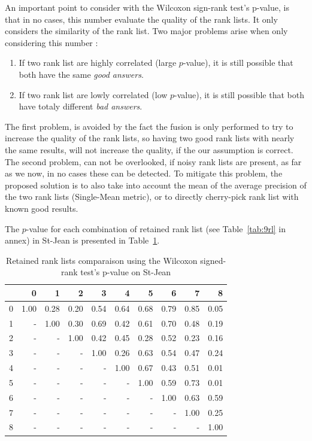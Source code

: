 An important point to consider with the Wilcoxon sign-rank test's p-value, is that in no cases, this number evaluate the quality of the rank lists.
It only considers the similarity of the rank list.
Two major problems arise when only considering this number :
\begin{enumerate}
  \item
  If two rank list are highly correlated (large $p$-value), it is still possible that both have the same \textit{good answers}.
  \item
  If two rank list are lowly correlated (low $p$-value), it is still possible that both have totaly different \textit{bad answers}.
\end{enumerate}
The first problem, is avoided by the fact the fusion is only performed to try to increase the quality of the rank lists, so having two good rank lists with nearly the same results, will not increase the quality, if the our assumption is correct.
The second problem, can not be overlooked, if noisy rank lists are present, as far as we now, in no cases these can be detected.
To mitigate this problem, the proposed solution is to also take into account the mean of the average precision of the two rank lists (Single-Mean metric), or to directly cherry-pick rank list with known good results.

The $p$-value for each combination of retained rank list (see Table~\ref{tab:9rl} in annex) in St-Jean is presented in Table~\ref{tab:rl_correlations}.

\begin{table}
  \centering
  \caption{Retained rank lists comparaison using the Wilcoxon signed-rank test's p-value on St-Jean}
  \label{tab:rl_correlations}
  \begin{tabular}{r|r r r r r r r r r}
    \toprule
      &    0 &    1 &    2 &    3 &    4 &    5 &    6 &    7 &    8 \\
    \midrule
    0 & 1.00 & 0.28 & 0.20 & 0.54 & 0.64 & 0.68 & 0.79 & 0.85 & 0.05 \\
    1 &    - & 1.00 & 0.30 & 0.69 & 0.42 & 0.61 & 0.70 & 0.48 & 0.19 \\
    2 &    - &    - & 1.00 & 0.42 & 0.45 & 0.28 & 0.52 & 0.23 & 0.16 \\
    3 &    - &    - &    - & 1.00 & 0.26 & 0.63 & 0.54 & 0.47 & 0.24 \\
    4 &    - &    - &    - &    - & 1.00 & 0.67 & 0.43 & 0.51 & 0.01 \\
    5 &    - &    - &    - &    - &    - & 1.00 & 0.59 & 0.73 & 0.01 \\
    6 &    - &    - &    - &    - &    - &    - & 1.00 & 0.63 & 0.59 \\
    7 &    - &    - &    - &    - &    - &    - &    - & 1.00 & 0.25 \\
    8 &    - &    - &    - &    - &    - &    - &    - &    - & 1.00 \\
    \bottomrule
  \end{tabular}
\end{table}
